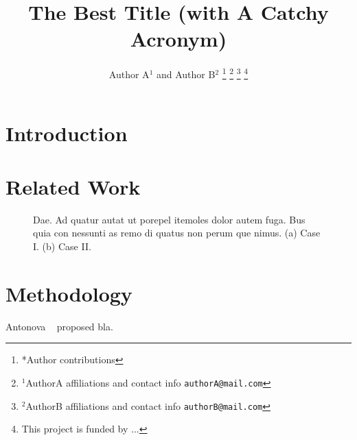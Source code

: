 \documentclass[letterpaper, 10 pt, conference, onecolumn]{IEEEtran}
\begin{document}
\title{\LARGE \bf The Best Title (with A Catchy Acronym)}
\author{Author A$^{1}$ and Author B$^{2}$
    \thanks{*Author contributions}
    \thanks{$^{1}$AuthorA affiliations and contact info
            {\tt\small authorA@mail.com}
    }
    \thanks{$^{2}$AuthorB affiliations and contact info
            {\tt\small authorB@mail.com}
    }
    \thanks{This project is funded by ...}
}
\maketitle

\begin{abstract}
    \lipsum[1-3]
\end{abstract}


\section{Introduction}

\lipsum[1-3]



\section{Related Work}
\lipsum[1-3]

\begin{figure*}[!t]
    \centering
    \hfil
    \caption{Dae. Ad quatur autat ut porepel itemoles dolor autem fuga. Bus quia con nessunti as remo di quatus non perum que nimus. (a) Case I. (b) Case II.}
    \label{fig_sim}
\end{figure*}

\lipsum[1-3]



\section{Methodology}

Antonova \etal~\cite{antonova_2021_SequentialTopologicalRepresentations} proposed bla.
\end{document}

